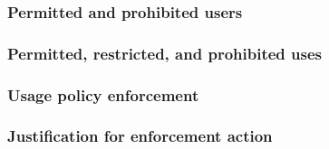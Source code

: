 \documentclass{article}
\begin{document}
\subsubsection{Permitted and prohibited users}


\subsubsection{Permitted, restricted, and prohibited uses}

\subsubsection{Usage policy enforcement}

\subsubsection{Justification for enforcement action}
\end{document}
